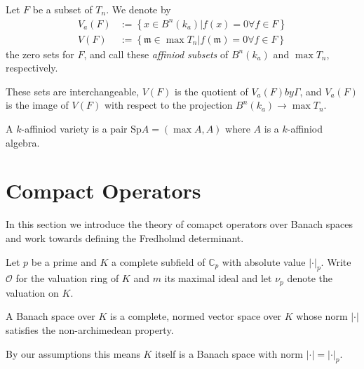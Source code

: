 \begin{definition}
  Let $F$ be a subset of $T_n$. We denote by
  \begin{align*}
    V_a(F) & := \left\{ x \in B^n(k_a) | f(x) = 0 \forall f \in F \right\} \\
    V(F) & := \left\{ \mathfrak{m} \in \max T_n | f (\mathfrak{m}) = 0 \forall f \in F \right\}
  \end{align*}
  the zero sets for $F$, and call these \emph{affiniod subsets} of $B^n (k_a)$ and $\max T_n$, respectively.
\end{definition}

These sets are interchangeable, $V(F)$ is the quotient of $V_a(F) by \Gamma$, and $V_a(F)$ is the
image of $V(F)$ with respect to the projection $B^n(k_a) \to \max T_n$.


\begin{definition}
  A $k$-affiniod variety is a pair $\text{Sp} A = (\max A, A)$ where $A$ is a $k$-affiniod algebra.
\end{definition}


\chapter{Compact Operators}




In this section we introduce the theory of comapct operators over Banach spaces and work towards
defining the Fredholmd determinant.

Let $p$ be a prime and $K$ a complete subfield of $\mathbb{C}_p$ with absolute value $|\cdot|_p$.
Write $\mathcal{O}$ for the valuation ring of $K$ and $m$ its maximal ideal and let $\nu_p$ denote
the valuation on $K$.

\begin{definition}
    A Banach space over $K$ is a complete, normed vector space over $K$ whose norm $|\cdot|$
    satisfies the non-archimedean property.
\end{definition}

\begin{remark}
    By our assumptions this means $K$ itself is a Banach space with norm $|\cdot| = | \cdot |_p.$
\end{remark}

